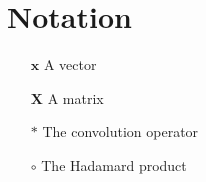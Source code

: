 \documentclass[./main.tex]{subfiles}
\begin{document}
\section*{Notation}
\begin{itemize}[leftmargin=2.0cm,labelsep=0.5cm]
    \item[$\bm{x}$] A vector
    \item[$\bm{X}$] A matrix
    \item[$*$] The convolution operator
    \item[$\circ$] The Hadamard product  
\end{itemize}
\end{document}
